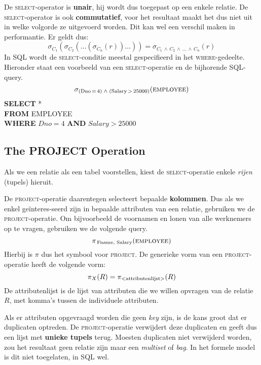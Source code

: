 \noindent De \textsc{select}-operator is \textbf{unair}, hij wordt dus toegepast op een enkele relatie. De \textsc{select}-operator is ook \textbf{commutatief}, voor het resultaat maakt het dus niet uit in welke volgorde ze uitgevoerd worden. Dit kan wel een verschil maken in performantie. Er geldt dus:
\vspace{-2mm}
\[ \sigma_{C_1} \left( \sigma_{C_2} \left( \dots \left( \sigma_{C_n} \left( r \right) \right) \dots \right) \right) = \sigma_{C_1 \,\wedge\, C_2 \,\wedge\, \dots \,\wedge\, C_n}(r) \]
In SQL wordt de \textsc{select}-conditie meestal gespecifieerd in het \textsc{where}-gedeelte. Hieronder staat een voorbeeld van een \textsc{select}-operatie en de bijhorende SQL-query.
\vspace{-2mm}
\[ \sigma_{(\text{Dno}\,=\,4) \; \wedge \; (\text{Salary}\,>\,25000)}(\textsc{employee}) \]
\indent \textbf{SELECT} *\\
\indent \textbf{FROM} EMPLOYEE\\
\indent	\textbf{WHERE} $\textit{Dno}=4$ \textbf{AND} $\textit{Salary}>25000$


\subsection{The PROJECT Operation}
Als we een relatie als een tabel voorstellen, kiest de \textsc{select}-operatie enkele \textit{rijen} (tupels) hieruit.

De \textsc{project}-operatie daarentegen selecteert bepaalde \textbf{kolommen}. Dus als we enkel ge\"interes-seerd zijn in bepaalde attributen van een relatie, gebruiken we de \textsc{project}-operatie. Om bijvoorbeeld de voornamen en lonen van alle werknemers op te vragen, gebruiken we de volgende query.
\vspace{-2mm}
\[ \pi_{\,\text{Fname, Salary}}(\textsc{employee}) \]
Hierbij is $\pi$ dus het symbool voor \textsc{project}. De generieke vorm van een \textsc{project}-operatie heeft de volgende vorm:
\vspace{-2mm}
\[ \pi_X(R) = \pi_\text{{\textless}attributenlijst{\textgreater}}(R) \]
De attributenlijst is de lijst van attributen die we willen opvragen van de relatie $R$, met komma's tussen de individuele attributen.

Als er attributen opgevraagd worden die geen \textit{key} zijn, is de kans groot dat er duplicaten optreden. De \textsc{project}-operatie verwijdert deze duplicaten en geeft dus een lijst met \textbf{unieke tupels} terug. Moesten duplicaten niet verwijderd worden, zou het resultaat geen relatie zijn maar een \textit{multiset} of \textit{bag}. In het formele model is dit niet toegelaten, in SQL wel.

